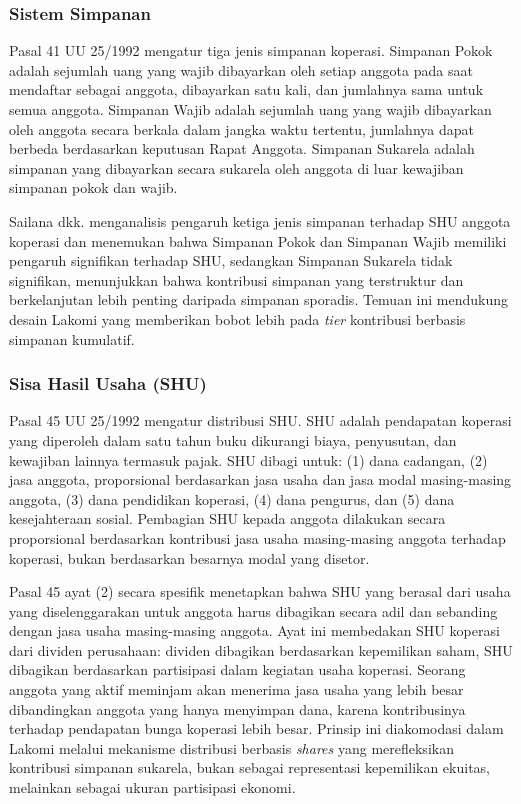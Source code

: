 \subsubsection{Sistem Simpanan}

Pasal 41 UU 25/1992 mengatur tiga jenis simpanan koperasi. Simpanan Pokok adalah sejumlah uang yang wajib dibayarkan oleh setiap anggota pada saat mendaftar sebagai anggota, dibayarkan satu kali, dan jumlahnya sama untuk semua anggota. Simpanan Wajib adalah sejumlah uang yang wajib dibayarkan oleh anggota secara berkala dalam jangka waktu tertentu, jumlahnya dapat berbeda berdasarkan keputusan Rapat Anggota. Simpanan Sukarela adalah simpanan yang dibayarkan secara sukarela oleh anggota di luar kewajiban simpanan pokok dan wajib.

Sailana dkk. \cite{sailana2023pengaruh} menganalisis pengaruh ketiga jenis simpanan terhadap SHU anggota koperasi dan menemukan bahwa Simpanan Pokok dan Simpanan Wajib memiliki pengaruh signifikan terhadap SHU, sedangkan Simpanan Sukarela tidak signifikan, menunjukkan bahwa kontribusi simpanan yang terstruktur dan berkelanjutan lebih penting daripada simpanan sporadis. Temuan ini mendukung desain Lakomi yang memberikan bobot lebih pada \textit{tier} kontribusi berbasis simpanan kumulatif.

\subsubsection{Sisa Hasil Usaha (SHU)}

Pasal 45 UU 25/1992 mengatur distribusi SHU. SHU adalah pendapatan koperasi yang diperoleh dalam satu tahun buku dikurangi biaya, penyusutan, dan kewajiban lainnya termasuk pajak. SHU dibagi untuk: (1) dana cadangan, (2) jasa anggota, proporsional berdasarkan jasa usaha dan jasa modal masing-masing anggota, (3) dana pendidikan koperasi, (4) dana pengurus, dan (5) dana kesejahteraan sosial. Pembagian SHU kepada anggota dilakukan secara proporsional berdasarkan kontribusi jasa usaha masing-masing anggota terhadap koperasi, bukan berdasarkan besarnya modal yang disetor.

Pasal 45 ayat (2) secara spesifik menetapkan bahwa SHU yang berasal dari usaha yang diselenggarakan untuk anggota harus dibagikan secara adil dan sebanding dengan jasa usaha masing-masing anggota. Ayat ini membedakan SHU koperasi dari dividen perusahaan: dividen dibagikan berdasarkan kepemilikan saham, SHU dibagikan berdasarkan partisipasi dalam kegiatan usaha koperasi. Seorang anggota yang aktif meminjam akan menerima jasa usaha yang lebih besar dibandingkan anggota yang hanya menyimpan dana, karena kontribusinya terhadap pendapatan bunga koperasi lebih besar. Prinsip ini diakomodasi dalam Lakomi melalui mekanisme distribusi berbasis \textit{shares} yang merefleksikan kontribusi simpanan sukarela, bukan sebagai representasi kepemilikan ekuitas, melainkan sebagai ukuran partisipasi ekonomi.

